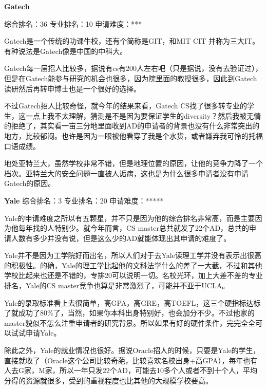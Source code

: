 \textbf{Gatech}\par
综合排名：36 专业排名：10 申请难度：*** \par

Gatech是一个传统的功课牛校，还有个简称是GIT，和MIT CIT 并称为三大IT。有种说法是Gatech像是中国的中科大。\par

Gatech每一届招人比较多，据说有cs有200人左右吧（只是据说，没有去验证过），但是在Gatech能参与研究的机会也很多，因为院里面的教授很多，因此到Gatech读研然后再转申博士也是一个很好的选择。\par

不过Gatech招人比较奇怪，就今年的结果来看，Gatech CS找了很多转专业的学生，这一点上我不太理解，猜测是不是因为要保证学生的diversity？然后我被无情的拒绝了，其实看一亩三分地里面收到AD的申请者的背景也没有什么非常突出的地方，比较郁闷。也许是因为一眼被他看穿了我是个水货，或者嫌弃我可怜的托福口语成绩。\par

地处亚特兰大，虽然学校非常不错，但是地理位置的原因，让他的竞争力降了一个档次。亚特兰大的安全问题一直被人诟病，这也是为什么很多申请者没有申请Gatech的原因。\par

\textbf{Yale}
综合排名：3 专业排名：20 申请难度：***** \par

Yale的申请难度之所以有五颗星，并不只是因为他的综合排名非常高，而是主要因为他每年找的人特别少。就今年而言，CS master总共就发了22个AD，总共的申请人数有多少并没有说，但是这么少的AD就能体现出其申请的难度了。\par

Yale并不是因为工学院好而出名，所以人们对于去Yale读理工学并没有表示出很高的积极性。的确，Yale的理工学比起他的文科法学什么的差了一大截，不过和其他学校比起来也还是不错的，专排20可以说明一切。名校光环，加上大差不差的专业排名，Yale的CS master竞争也算是非常激烈了，可能并不亚于UCLA。\par

Yale的录取标准看上去很简单，高GPA，高GRE，高TOEFL，这三个硬指标达标了就成功了80\%了，当然，如果你本科出身特别好，也会加分不少。不过他家的master貌似不怎么注重申请者的研究背景。所以如果有好的硬件条件，完完全全可以试试申请Yale。\par

除此之外，Yale的就业情况也很好。据说Oracle招人的时候，只要是Yale的学生，直接就收了（Oracle这个公司比较奇葩，比较喜欢名校出身+高GPA），每年也有人去G家，M家，所以一年只发22个AD，可能去10多个人或者不到十个人，平均分得的资源就很多，受到的重视程度也比其他的大规模学校要高。\par

